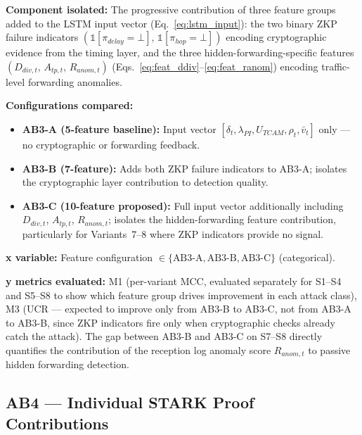 \documentclass[12pt, a4paper]{report}
\begin{document}
{{\textbf{Component isolated:}
The progressive contribution of three feature groups
added to the \ac{LSTM} input vector
(Eq.~\ref{eq:lstm_input}): the two binary \ac{ZKP}
failure indicators
$(\mathbb{1}[\pi_{delay}{=}\bot],\,
\mathbb{1}[\pi_{hop}{=}\bot])$ encoding cryptographic
evidence from the timing layer, and the three
hidden-forwarding-specific features
$(D_{div,t},\, A_{tp,t},\, R_{anom,t})$
(Eqs.~\ref{eq:feat_ddiv}--\ref{eq:feat_ranom})
encoding traffic-level forwarding anomalies.

\textbf{Configurations compared:}
\begin{itemize}
    \item \textbf{AB3-A (5-feature baseline):}
    Input vector $[\delta_t, \lambda_{PI},
    U_{TCAM}, \rho_t, \bar{v}_t]$ only ---
    no cryptographic or forwarding feedback.
    \item \textbf{AB3-B (7-feature):}
    Adds both \ac{ZKP} failure indicators to
    AB3-A; isolates the cryptographic layer
    contribution to detection quality.
    \item \textbf{AB3-C (10-feature proposed):}
    Full input vector additionally including
    $D_{div,t}$, $A_{tp,t}$, $R_{anom,t}$;
    isolates the hidden-forwarding feature
    contribution, particularly for Variants~7--8
    where \ac{ZKP} indicators provide no signal.
\end{itemize}

\textbf{x variable:} Feature configuration
$\in \{\text{AB3-A}, \text{AB3-B},
\text{AB3-C}\}$ (categorical).

\textbf{y metrics evaluated:} M1 (per-variant
\ac{MCC}, evaluated separately for S1--S4
and S5--S8 to show which feature group drives
improvement in each attack class), M3 (UCR ---
expected to improve only from AB3-B to AB3-C,
not from AB3-A to AB3-B, since \ac{ZKP}
indicators fire only when cryptographic checks
already catch the attack). The gap between AB3-B
and AB3-C on S7--S8 directly quantifies the
contribution of the reception log anomaly score
$R_{anom,t}$ to passive hidden forwarding
detection.



\subsection{AB4 — Individual STARK Proof Contributions}
\label{sec:ab4}

}}
\end{document}

